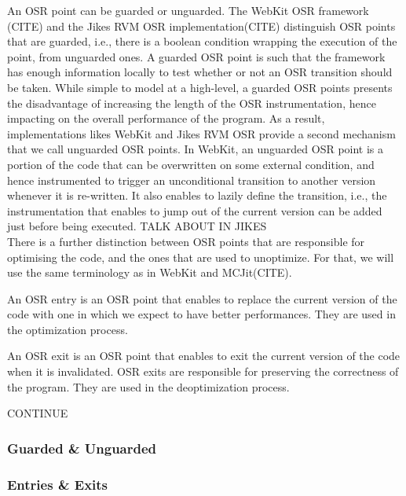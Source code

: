An OSR point can be guarded or unguarded.
The WebKit OSR framework (CITE) and the Jikes RVM OSR implementation(CITE) distinguish OSR points that are guarded, i.e., there is a boolean condition wrapping the execution of the point, from unguarded ones.
A guarded OSR point is such that the framework has enough information locally to test whether or not an OSR transition should be taken.
While simple to model at a high-level, a guarded OSR points presents the disadvantage of increasing the length of the OSR instrumentation, hence impacting on the overall performance of the program.
As a result, implementations likes WebKit and Jikes RVM OSR provide a second mechanism that we call unguarded OSR points.
In WebKit, an unguarded OSR point is a portion of the code that can be overwritten on some external condition, and hence instrumented to trigger an unconditional transition to another version whenever it is re-written.
It also enables to lazily define the transition, i.e., the instrumentation that enables to jump out of the current version can be added just before being executed.
TALK ABOUT IN JIKES\\

There is a further distinction between OSR points that are responsible for optimising the code, and the ones that are used to unoptimize.
For that, we will use the same terminology as in WebKit and MCJit(CITE).
\begin{definition}\label{OSREntryDefinition}
An OSR entry is an OSR point that enables to replace the current version of the code with one in which we expect to have better performances.
They are used in the optimization process.
\end{definition}

\begin{definition}
An OSR exit is an OSR point that enables to exit the current version of the code when it is invalidated.
OSR exits are responsible for preserving the correctness of the program.
They are used in the deoptimization process.
\end{definition}

CONTINUE
\subsubsection{Guarded \& Unguarded}
\subsubsection{Entries \& Exits}

